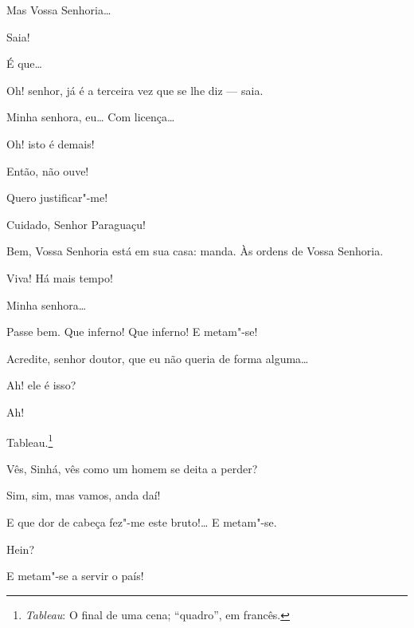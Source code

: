  Mas Vossa Senhoria\ldots{}

 Saia!

 É que\ldots{}

 Oh! senhor, já é a terceira vez que se lhe diz --- saia.

 Minha senhora, eu\ldots{}  Com licença\ldots{}

 Oh! isto é demais!

 Então, não ouve!

 Quero justificar"-me!

  Cuidado, Senhor Paraguaçu!

 Bem, Vossa Senhoria está em sua casa: manda.
 Às ordens
de Vossa Senhoria.

 Viva! Há mais tempo! 

 Minha senhora\ldots{}

 Passe bem.  Que inferno!
Que inferno! E metam"-se!

  Acredite, senhor doutor, que eu não
queria de forma alguma\ldots{}

  Ah! ele é isso? 

  Ah! 

  Tableau.\footnote{ \textit{Tableau}: O final de uma cena;
``quadro'', em francês.}




 Vês, Sinhá, vês como um homem se deita a perder?

 Sim, sim, mas vamos, anda daí!

  E que dor
de cabeça fez"-me este bruto!\ldots{} E metam"-se.

 Hein?

 E metam"-se a servir o país!

